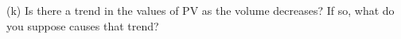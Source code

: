 (k) Is there a trend in the values of PV as the volume decreases? If so, 
what do you suppose causes that trend?







